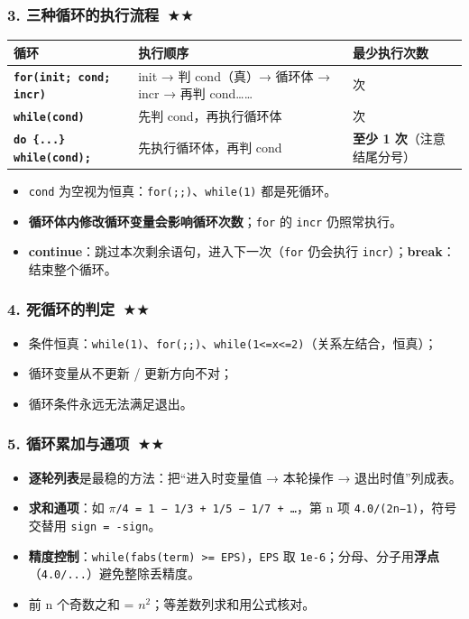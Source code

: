 \documentclass[UTF8,zihao=-4,a4paper]{ctexart}
\newcommand{\cstar}{\textcolor{deepred}{$\bigstar$}}
\begin{document}
\subsubsection*{3. 三种循环的执行流程\ \cstar\cstar}
\begin{center}\small
\begin{tabularx}{\linewidth}{>{\bfseries}p{2.2cm} X >{\raggedright\arraybackslash}p{3.6cm}}
\toprule
循环 & 执行顺序 & 最少执行次数\\
\midrule
\texttt{for(init; cond; incr)} & init → 判 cond（真）→ 循环体 → incr → 再判 cond…… & 0 次\\
\texttt{while(cond)} & 先判 cond，再执行循环体 & 0 次\\
\texttt{do \{...\} while(cond);} & 先执行循环体，再判 cond & \textbf{至少 1 次}（注意结尾分号）\\
\bottomrule
\end{tabularx}
\end{center}
\begin{itemize}
  \item \texttt{cond} 为空视为恒真：\texttt{for(;;)}、\texttt{while(1)} 都是死循环。
  \item \textbf{循环体内修改循环变量会影响循环次数}；\texttt{for} 的 \texttt{incr} 仍照常执行。
  \item \textbf{continue}：跳过本次剩余语句，进入下一次（\texttt{for} 仍会执行 \texttt{incr}）；\textbf{break}：结束整个循环。
\end{itemize}

\subsubsection*{4. 死循环的判定\ \cstar\cstar}
\begin{itemize}
  \item 条件恒真：\texttt{while(1)}、\texttt{for(;;)}、\texttt{while(1<=x<=2)}（关系左结合，恒真）；
  \item 循环变量从不更新 / 更新方向不对；
  \item 循环条件永远无法满足退出。
\end{itemize}

\subsubsection*{5. 循环累加与通项\ \cstar\cstar}
\begin{itemize}
  \item \textbf{逐轮列表}是最稳的方法：把“进入时变量值 → 本轮操作 → 退出时值”列成表。
  \item \textbf{求和通项}：如 \texttt{$\pi$/4 = 1 − 1/3 + 1/5 − 1/7 + …}，第 n 项 \texttt{4.0/(2n−1)}，符号交替用 \texttt{sign = -sign}。
  \item \textbf{精度控制}：\texttt{while(fabs(term) >= EPS)}，\texttt{EPS} 取 \texttt{1e-6}；分母、分子用\textbf{浮点}（\texttt{4.0/...}）避免整除丢精度。
  \item 前 n 个奇数之和 = $n^2$；等差数列求和用公式核对。
\end{itemize}
\end{document}

